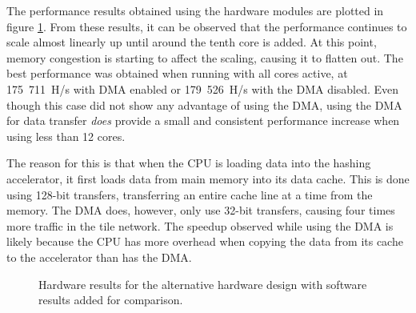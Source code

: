 The performance results obtained using the hardware modules are plotted in figure \ref{fig:shadmacomp-scaling2}.
From these results, it can be observed that the performance continues to scale almost linearly up until around
the tenth core is added. At this point, memory congestion is starting to affect the scaling, causing it to
flatten out. The best performance was obtained when running with all cores active, at 175~711~H/s with DMA
enabled or 179~526~H/s with the DMA disabled. Even though this case did not show any advantage of using the
DMA, using the DMA for data transfer \emph{does} provide a small and consistent performance increase when using less than 
12 cores.

The reason for this is that when the CPU is loading data into the hashing accelerator, it first loads
data from main memory into its data cache. This is done using 128-bit transfers, transferring an entire
cache line at a time from the memory. The DMA does, however, only use 32-bit transfers, causing four times
more traffic in the tile network. The speedup observed while using the DMA is likely because the CPU has more
overhead when copying the data from its cache to the accelerator than has the DMA.

\begin{figure}
	\centering
	\caption{Hardware results for the alternative hardware design with software results added for comparison.}
	\label{fig:shadmacomp-scaling2}
\end{figure}

